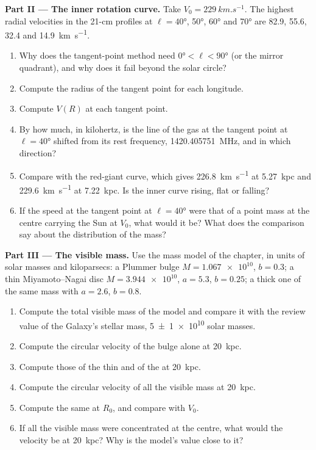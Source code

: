 \begin{problem}
\medskip\noindent\textbf{Part II --- The inner rotation curve.} Take
$V_0 = \qty{229}{km.s^{-1}}$. The highest radial velocities in the
21-cm profiles at $\ell = \ang{40}$, \ang{50}, \ang{60} and \ang{70} are
82.9, 55.6, 32.4 and \qty{14.9}{km.s^{-1}}.
\begin{enumerate}[resume]
\item Why does the tangent-point method need $\ang{0} < \ell < \ang{90}$
  (or the mirror quadrant), and why does it fail beyond the solar circle?
\item Compute the radius of the tangent point for each longitude.
\item Compute $V(R)$ at each tangent point.
\item By how much, in kilohertz, is the line of the gas at the tangent
  point at $\ell = \ang{40}$ shifted from its rest frequency,
  \qty{1420.405751}{MHz}, and in which direction?
\item Compare with the red-giant curve, which gives \qty{226.8}{km.s^{-1}}
  at \qty{5.27}{kpc} and \qty{229.6}{km.s^{-1}} at \qty{7.22}{kpc}. Is the
  inner curve rising, flat or falling?
\item If the speed at the tangent point at $\ell = \ang{40}$ were that of
  a point mass at the centre carrying the Sun at $V_0$, what would it be?
  What does the comparison say about the distribution of the mass?
\end{enumerate}

\medskip\noindent\textbf{Part III --- The visible mass.} Use the mass
model of the chapter, in units of solar masses and kiloparsecs: a
Plummer bulge $M = \num{1.067e10}$, $b = 0.3$; a thin Miyamoto--Nagai disc
$M = \num{3.944e10}$, $a = 5.3$, $b = 0.25$; a thick one of the same
mass with $a = 2.6$, $b = 0.8$.
\begin{enumerate}[resume]
\item Compute the total visible mass of the model and compare it with the
  review value of the Galaxy's stellar mass, \qty[separate-uncertainty=true]{5 \pm 1 e10}{} solar
  masses.
\item Compute the circular velocity of the bulge alone at \qty{20}{kpc}.
\item Compute those of the thin and of the  at \qty{20}{kpc}.
\item Compute the circular velocity of all the visible mass at
  \qty{20}{kpc}.
\item Compute the same at $R_0$, and compare with $V_0$.
\item If all the visible mass were concentrated at the centre, what would
  the velocity be at \qty{20}{kpc}? Why is the model's value close to it?
\end{enumerate}


\end{problem}
